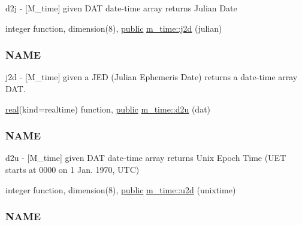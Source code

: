 \begin{DoxyCompactItemize}
\begin{DoxyCompactList}
d2j -\/ \mbox{[}M\+\_\+time\mbox{]} given D\+AT date-\/time array returns Julian Date \end{DoxyCompactList}\item 
integer function, dimension(8), \hyperlink{M__stopwatch_83_8txt_a2f74811300c361e53b430611a7d1769f}{public} \hyperlink{namespacem__time_a3ad5cad6df02c53e0429c3602a072e3c}{m\+\_\+time\+::j2d} (julian)
\begin{DoxyCompactList}\small\item\em \subsubsection*{N\+A\+ME}

j2d -\/ \mbox{[}M\+\_\+time\mbox{]} given a J\+ED (Julian Ephemeris Date) returns a date-\/time array D\+AT. \end{DoxyCompactList}\item 
\hyperlink{read__watch_83_8txt_abdb62bde002f38ef75f810d3a905a823}{real}(kind=realtime) function, \hyperlink{M__stopwatch_83_8txt_a2f74811300c361e53b430611a7d1769f}{public} \hyperlink{namespacem__time_a1506e2889a156387df4481ed0534be81}{m\+\_\+time\+::d2u} (dat)
\begin{DoxyCompactList}\small\item\em \subsubsection*{N\+A\+ME}

d2u -\/ \mbox{[}M\+\_\+time\mbox{]} given D\+AT date-\/time array returns Unix Epoch Time (U\+ET starts at 0000 on 1 Jan. 1970, U\+TC) \end{DoxyCompactList}\item 
integer function, dimension(8), \hyperlink{M__stopwatch_83_8txt_a2f74811300c361e53b430611a7d1769f}{public} \hyperlink{namespacem__time_a083bc231f8ba1879d7f86ab424e77d6c}{m\+\_\+time\+::u2d} (unixtime)
\begin{DoxyCompactList}\small\item\em \subsubsection*{N\+A\+ME}


\end{DoxyCompactList}
\end{DoxyCompactItemize}
